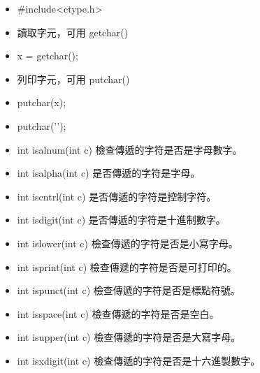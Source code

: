 \begin{itemize}
\item #include<ctype.h>

\item 讀取字元，可用 getchar()
\item x = getchar();
\item 列印字元，可用 putchar()
\item putchar(x);
\item putchar('\n');

\item int isalnum(int c) 檢查傳遞的字符是否是字母數字。
\item int isalpha(int c) 是否傳遞的字符是字母。
\item int iscntrl(int c) 是否傳遞的字符是控制字符。
\item int isdigit(int c) 是否傳遞的字符是十進制數字。
\item int islower(int c) 檢查傳遞的字符是否是小寫字母。
\item int isprint(int c) 檢查傳遞的字符是否是可打印的。
\item int ispunct(int c) 檢查傳遞的字符是否是標點符號。
\item int isspace(int c) 檢查傳遞的字符是否是空白。
\item int isupper(int c) 檢查傳遞的字符是否是大寫字母。
\item int isxdigit(int c) 檢查傳遞的字符是否是十六進製數字。

\end{itemize}